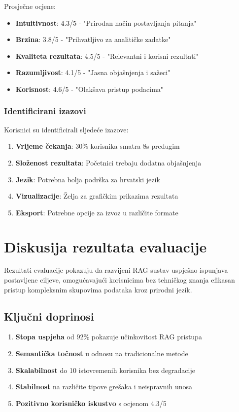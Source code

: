 Prosječne ocjene:
\begin{itemize}
    \item \textbf{Intuitivnost}: 4.3/5 - "Prirodan način postavljanja pitanja"
    \item \textbf{Brzina}: 3.8/5 - "Prihvatljivo za analitičke zadatke"
    \item \textbf{Kvaliteta rezultata}: 4.5/5 - "Relevantni i korisni rezultati"
    \item \textbf{Razumljivost}: 4.1/5 - "Jasna objašnjenja i sažeci"
    \item \textbf{Korisnost}: 4.6/5 - "Olakšava pristup podacima"
\end{itemize}

\subsubsection{Identificirani izazovi}

Korisnici su identificirali sljedeće izazove:

\begin{enumerate}
    \item \textbf{Vrijeme čekanja}: 30\% korisnika smatra 8s predugim
    \item \textbf{Složenost rezultata}: Početnici trebaju dodatna objašnjenja
    \item \textbf{Jezik}: Potrebna bolja podrška za hrvatski jezik
    \item \textbf{Vizualizacije}: Želja za grafičkim prikazima rezultata
    \item \textbf{Eksport}: Potrebne opcije za izvoz u različite formate
\end{enumerate}

\section{Diskusija rezultata evaluacije}

Rezultati evaluacije pokazuju da razvijeni RAG sustav uspješno ispunjava postavljene ciljeve, omogućavajući korisnicima bez tehničkog znanja efikasan pristup kompleksnim skupovima podataka kroz prirodni jezik.

\subsection{Ključni doprinosi}

\begin{enumerate}
    \item \textbf{Stopa uspjeha} od 92\% pokazuje učinkovitost RAG pristupa
    \item \textbf{Semantička točnost} u odnosu na tradicionalne metode
    \item \textbf{Skalabilnost} do 10 istovremenih korisnika bez degradacije
    \item \textbf{Stabilnost} na različite tipove grešaka i neispravnih unosa
    \item \textbf{Pozitivno korisničko iskustvo} s ocjenom 4.3/5
\end{enumerate}

